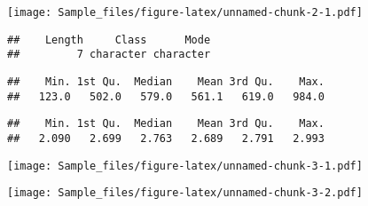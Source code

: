 \documentclass[
]{article}
\newenvironment{Shaded}{\begin{snugshade}}{\end{snugshade}}
\newcommand{\AttributeTok}[1]{\textcolor[rgb]{0.77,0.63,0.00}{#1}}
\newcommand{\FunctionTok}[1]{\textcolor[rgb]{0.00,0.00,0.00}{#1}}
\newcommand{\NormalTok}[1]{#1}
\newcommand{\SpecialCharTok}[1]{\textcolor[rgb]{0.00,0.00,0.00}{#1}}
\newcommand{\StringTok}[1]{\textcolor[rgb]{0.31,0.60,0.02}{#1}}
\begin{document}
\texttt{[image: Sample\_files/figure-latex/unnamed-chunk-2-1.pdf]}

\begin{Shaded}
\end{Shaded}

\begin{verbatim}
##    Length     Class      Mode 
##         7 character character
\end{verbatim}

\begin{Shaded}
\end{Shaded}

\begin{verbatim}
##    Min. 1st Qu.  Median    Mean 3rd Qu.    Max. 
##   123.0   502.0   579.0   561.1   619.0   984.0
\end{verbatim}

\begin{Shaded}
\end{Shaded}

\begin{verbatim}
##    Min. 1st Qu.  Median    Mean 3rd Qu.    Max. 
##   2.090   2.699   2.763   2.689   2.791   2.993
\end{verbatim}

\begin{Shaded}
\end{Shaded}

\texttt{[image: Sample\_files/figure-latex/unnamed-chunk-3-1.pdf]}

\begin{Shaded}
\end{Shaded}

\texttt{[image: Sample\_files/figure-latex/unnamed-chunk-3-2.pdf]}
\end{document}
